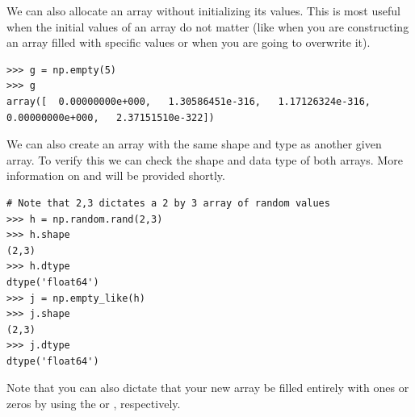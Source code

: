 We can also allocate an array without initializing its
values. This is most useful when the initial values of an
array do not matter (like when you are constructing an array filled with
specific values or when you are going to overwrite it).
\begin{lstlisting}
>>> g = np.empty(5) 
>>> g
array([  0.00000000e+000,   1.30586451e-316,   1.17126324e-316,
0.00000000e+000,   2.37151510e-322]) 
\end{lstlisting} 

We can also create an array with the same shape and type as another given array. 
To verify this we can check the shape and data type of both arrays. More information
on  and  will be provided shortly.
\begin{lstlisting}
# Note that 2,3 dictates a 2 by 3 array of random values
>>> h = np.random.rand(2,3) 
>>> h.shape
(2,3)
>>> h.dtype
dtype('float64')
>>> j = np.empty_like(h)
>>> j.shape
(2,3)
>>> j.dtype
dtype('float64')
\end{lstlisting} 
Note that you can also dictate that your new array be
filled entirely with ones or zeros by using the  or
, respectively.


